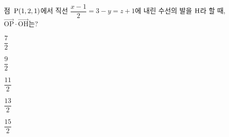 점~$\mathrm{P}(1{,}\mkern3mu\mathopen{}2{,}\mkern3mu\mathopen{}1)$에서 직선 $\dfrac{x-1}{2}=3-y=z+1$에 내린 수선의 발을 $\mathrm{H}$라 할 때, $\overrightarrow{\mathrm{OP}}\cdot\overrightarrow{\mathrm{OH}}$는? 
\begin{choices32}{\rule[-3ex]{0pt}{8ex}$\dfrac{7}{2}$}{\rule[-3ex]{0pt}{8ex}$\dfrac{9}{2}$}{\rule[-3ex]{0pt}{8ex}$\dfrac{11}{2}$}{\rule[-3ex]{0pt}{8ex}$\dfrac{13}{2}$}{\rule[-3ex]{0pt}{8ex}$\dfrac{15}{2}$}\end{choices32}
